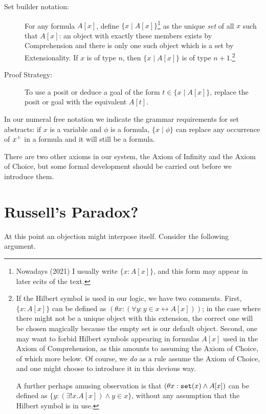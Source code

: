 \documentclass[12pt]{book}
\begin{document}
\begin{description}

\item[Set builder notation:] For any formula $A[x]$, define $\{x \mid
A[x]\}$\footnote{Nowadays (2021) I usually write $\{x :
A[x]\}$, and this form may appear in later ecits of the text.} as the unique {\em set\/} of all $x$ such that $A[x]$: an object with exactly these members exists by
Comprehension and there is only one such object which is a set by Extensionality.  If $x$ is
of type $n$, then $\{x \mid A[x]\}$ is of type $n+1$.\footnote{If the Hilbert symbol is used in our logic, we have two comments.  First, $\{x:A[x]\}$ can
be defined as $(\theta x:(\forall y:y \in x \leftrightarrow A[x]))$; in the case where there might  not be a unique object with this extension, the correct one will be chosen magically because the empty set is our default object.  Second, one may want to forbid Hilbert symbols appearing in formulas $A[x]$ used in the Axiom of Comprehension, as this amounts to assuming the Axiom of Choice, of which more below.  Of course, we {\em do\/} as a rule assume the Axiom of Choice, and one might choose to introduce it in this devious way.

A further perhaps amusing observation is that $(\theta x:{\tt set}(x) \wedge A[x])$ can be defined as $\{y:(\exists!x.A[x]) \wedge y \in x\}$, without any assumption that the Hilbert symbol is in use.}

\item[Proof Strategy:] To use a posit or deduce a goal of the form $t
\in \{x \mid A[x]\}$, replace the posit or goal with the equivalent
$A[t]$.

\end{description}

In our numeral free notation we indicate the grammar requirements for
set abstracts: if $x$ is a variable and $\phi$ is a formula, $\{x
\mid \phi\}$ can replace any occurrence of $x^{\bf +}$ in a formula and it
will still be a formula.

There are two other axioms in our system, the Axiom of Infinity and
the Axiom of Choice, but some formal development should be carried out
before we introduce them.

\newpage

\section{Russell's Paradox?}

At this point an objection might interpose itself.  Consider the
following argument.
\end{document}
